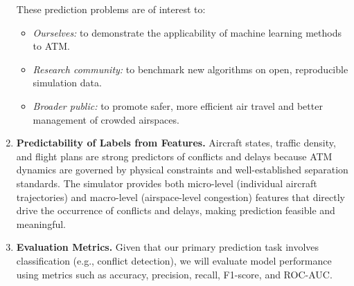 \documentclass[a4paper]{article}
\begin{document}
\begin{enumerate}
These prediction problems are of interest to:
\begin{itemize}
    \item \emph{Ourselves:} to demonstrate the applicability of machine learning methods to ATM.
    \item \emph{Research community:} to benchmark new algorithms on open, reproducible simulation data.
    \item \emph{Broader public:} to promote safer, more efficient air travel and better management of crowded airspaces.
\end{itemize}

\item \textbf{Predictability of Labels from Features.}
Aircraft states, traffic density, and flight plans are strong predictors of conflicts and delays because ATM dynamics are governed by physical constraints and well-established separation standards. The simulator provides both micro-level (individual aircraft trajectories) and macro-level (airspace-level congestion) features that directly drive the occurrence of conflicts and delays, making prediction feasible and meaningful.


\item \textbf{Evaluation Metrics.}  
Given that our primary prediction task involves classification (e.g., conflict detection), we will evaluate model performance using metrics such as accuracy, precision, recall, F1-score, and ROC-AUC.

\end{enumerate}
\end{document}

